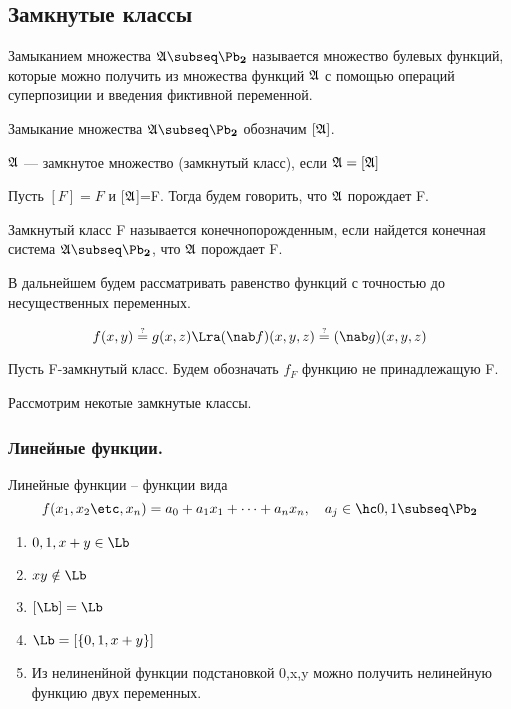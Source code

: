 \documentclass[unicode, 10pt, a4paper, oneside, fleqn]{article}
\begin{document}
\subsection{Замкнутые классы}
\begin{df}
  Замыканием множества $\ag\subseq\PD$ называется множество булевых функций, 
  которые можно получить из множества функций $\mathfrak{A}$ с помощью операций 
  суперпозиции и введения фиктивной переменной.
\end{df}
\begin{denote}
  Замыкание множества $\ag\subseq\PD$ обозначим $[\mathfrak{A}]$.
\end{denote}
\begin{df}
  $\mathfrak{A}$ --- замкнутое множество (замкнутый класс), если $\mathfrak{A} = [\mathfrak{A}]$
\end{df}
\begin{df}
  Пусть $[F]=F$ и [$\mathfrak{A}$]=F. Тогда будем говорить, что $\mathfrak{A}$ порождает F.
\end{df}
\begin{df}
    Замкнутый класс F называется конечнопорожденным, если найдется конечная система 
    $\ag\subseq\PD$, что $\mathfrak{A}$ порождает F.
\end{df}
\begin{prop}
  В дальнейшем будем рассматривать равенство функций с точностью до несущественных переменных.
  \begin{ex}
    \begin{displaymath}
      f(x,y)\queq g(x,z) \Lra (\nab f)(x,y,z) \queq (\nab g)(x,y,z)
    \end{displaymath}
  \end{ex}
\end{prop}
\begin{denote}
  Пусть F-замкнутый класс. Будем обозначать $f_F$ функцию не принадлежащую F.
\end{denote}
Рассмотрим некотые замкнутые классы.
\subsubsection{Линейные функции.}
  \begin{df}
    Линейные функции -- функции вида
    \begin{displaymath}
      f(\set[x]{n}) = a_0+a_1x_1+\cdots+a_nx_n, \quad \pcoef
    \end{displaymath}
  \end{df}
  \property
  \begin{enumerate}
    \item $0, 1, x+y\in\Lb$
    \item $xy\notin\Lb$
    \item $[\Lb] = \Lb$
    \item $\Lb = \cls{0,1,x+y}$
    \item 
      \begin{stm}
	Из нелиненйной функции подстановкой 0,x,y можно получить 
        нелинейную функцию двух переменных.
      \end{stm}
  \end{enumerate}
\end{document}
